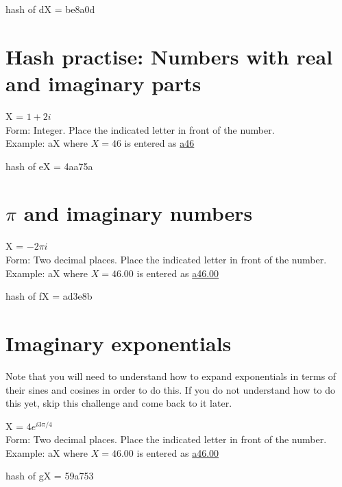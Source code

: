 hash of dX = be8a0d

\section{Hash practise: Numbers with real and imaginary parts}

X = $1+2i$\\
Form: Integer.
Place the indicated letter in front of the number.\\
Example: aX where $X=46$ is entered as \href{http://www.wolframalpha.com/input/?i=md5+hash+of+\%22a46\%22}{a46}

hash of eX = 4aa75a

\section{$\pi$ and imaginary numbers}

X = $-2\pi i$\\
Form: Two decimal places.
Place the indicated letter in front of the number.\\
Example: aX where $X=46.00$ is entered as \href{http://www.wolframalpha.com/input/?i=md5+hash+of+\%22a46\%22}{a46.00}

hash of fX = ad3e8b

\section{Imaginary exponentials}

Note that you will need to understand how to expand exponentials in terms of their sines and cosines in order to do this. If you do not understand how to do this yet, skip this challenge and come back to it later.

X = $4e^{i 3 \pi/4}$\\
Form: Two decimal places.
Place the indicated letter in front of the number.\\
Example: aX where $X=46.00$ is entered as \href{http://www.wolframalpha.com/input/?i=md5+hash+of+\%22a46\%22}{a46.00}

hash of gX = 59a753
